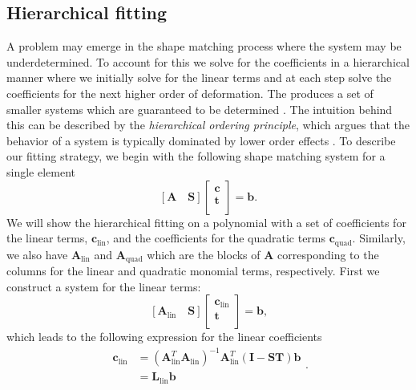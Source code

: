 \subsection{Hierarchical fitting}
A problem may emerge in the shape matching process where the system may be underdetermined. To account for this we solve for the coefficients in a hierarchical manner where we initially solve for the linear terms and at each step solve the coefficients for the next higher order of deformation. The produces a set of smaller systems which are guaranteed to be determined . The intuition behind this can be described by the \textit{hierarchical ordering principle}, which argues that the behavior of a system is typically dominated by lower order effects . To describe our fitting strategy, we begin with the following shape matching system for a single element
\begin{equation}
\label{eqn:fitting_one}
\left[
\mathbf{A} \quad \mathbf{S}
\right]
\left[ \begin{array}{c}
\mathbf{c} \\
\mathbf{t} \\
\end{array} \right] = \mathbf{b}
\text{.}
\end{equation}
We will show the hierarchical fitting on a polynomial with a set of coefficients for the linear terms, $\mathbf{c}_{\text{lin}}$, and the coefficients for the quadratic terms $\mathbf{c}_{\text{quad}}$. Similarly, we also have $\mathbf{A}_{\text{lin}}$ and $\mathbf{A}_{\text{quad}}$ which are the blocks of $\mathbf{A}$ corresponding to the columns for the linear and quadratic monomial terms, respectively. First we construct a system for the linear terms:
\begin{equation}
\label{eqn:fitting_linear}
\left[
\mathbf{A}_{\text{lin}} \quad \mathbf{S}
\right]
\left[ \begin{array}{c}
\mathbf{c}_{\text{lin}} \\
\mathbf{t} \\
\end{array} \right] = \mathbf{b}
\text{,}
\end{equation}
which leads to the following expression for the linear coefficients
\begin{equation}
\label{eqn:c_linear}
\begin{split}
\mathbf{c}_{\text{lin}} & = (\mathbf{A}_{\text{lin}}^T\mathbf{A}_{\text{lin}})^{-1}\mathbf{A}_{\text{lin}}^T(\mathbf{I-ST})\mathbf{b} \\
           & = \mathbf{L}_{\text{lin}}\mathbf{b}
\end{split}
\text{.}
\end{equation}
